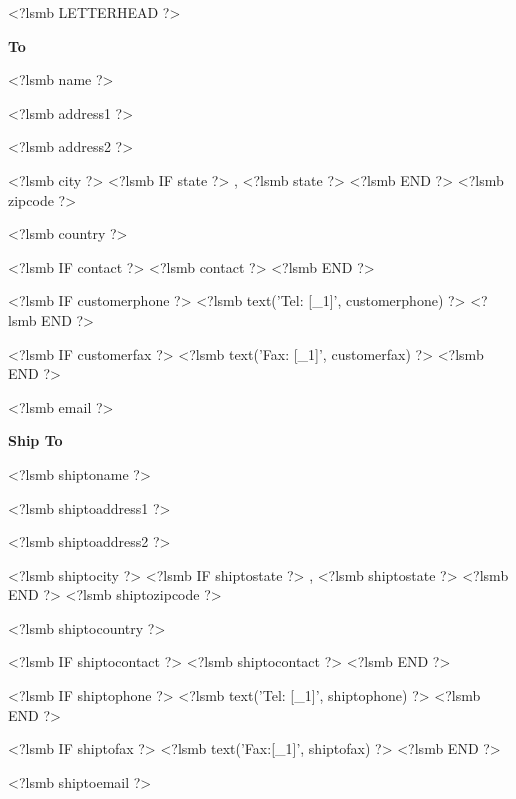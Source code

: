 \documentclass{scrartcl}
\begin{document}
\pagestyle{myheadings}
\thispagestyle{empty}

<?lsmb LETTERHEAD ?>


%
%
%


\vspace*{0.5cm}

\parbox[t]{.5\textwidth}{
\textbf{To}
\vspace{0.3cm}

<?lsmb name ?>

<?lsmb address1 ?>

<?lsmb address2 ?>

<?lsmb city ?>
<?lsmb IF state ?>
\hspace{-0.1cm}, <?lsmb state ?>
<?lsmb END ?>
<?lsmb zipcode ?>

<?lsmb country ?>

\vspace{0.3cm}

<?lsmb IF contact ?>
<?lsmb contact ?>
\vspace{0.2cm}
<?lsmb END ?>

<?lsmb IF customerphone ?>
<?lsmb text('Tel: [_1]', customerphone) ?>
<?lsmb END ?>

<?lsmb IF customerfax ?>
<?lsmb text('Fax: [_1]', customerfax) ?>
<?lsmb END ?>

<?lsmb email ?>
}
\parbox[t]{.5\textwidth}{
\textbf{Ship To}
\vspace{0.3cm}

<?lsmb shiptoname ?>

<?lsmb shiptoaddress1 ?>

<?lsmb shiptoaddress2 ?>

<?lsmb shiptocity ?>
<?lsmb IF shiptostate ?>
\hspace{-0.1cm}, <?lsmb shiptostate ?>
<?lsmb END ?>
<?lsmb shiptozipcode ?>

<?lsmb shiptocountry ?>

\vspace{0.3cm}

<?lsmb IF shiptocontact ?>
<?lsmb shiptocontact ?>
\vspace{0.2cm}
<?lsmb END ?>

<?lsmb IF shiptophone ?>
<?lsmb text('Tel: [_1]', shiptophone) ?>
<?lsmb END ?>

<?lsmb IF shiptofax ?>
<?lsmb text('Fax:[_1]', shiptofax) ?>
<?lsmb END ?>

<?lsmb shiptoemail ?>
}
\hfill
\end{document}
